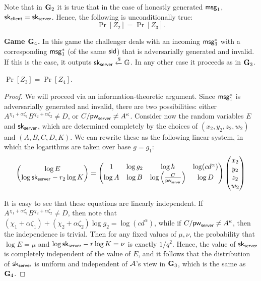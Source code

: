 Note that in $\mathbf{G}_2$ it is true that in the case of honestly generated $\mathsf{msg}_{1}$, $\mathsf{sk}_{\mathsf{client}} = \mathsf{sk}_{\mathsf{server}}$. Hence, the following is unconditionally true: $$\Pr[Z_2]=\Pr[Z_3].$$

\textbf{Game $\mathbf{G}_4$.} In this game the challenger deals with an incoming $\mathsf{msg}_{3}^{*}$ with a corresponding $\mathsf{msg}_{1}^{*}$ (of the same $\mathsf{sid}$) that is adversarially generated and invalid. If this is the case, it outputs $\mathsf{sk}_{\mathsf{server}}\xleftarrow{\$}\mathbb{G}$. In any other case it proceeds as in $\mathbf{G}_3$.

\begin{lemma}
\label{lem:invalid}
	$\Pr[Z_3]=\Pr[Z_4]$.
\end{lemma}
\begin{proof}
	We will proceed via an information-theoretic argument. Since $\mathsf{msg}_{1}^{*}$ is adversarially generated and invalid, there are two possibilities: either $A^{\chi_1+\alpha\zeta_1}B^{\chi_2+\alpha\zeta_2}\neq D$, or $C/\mathsf{pw}_{\mathsf{server}}\neq A^\kappa$. Consider now the random variables $E$ and $\mathsf{sk}_{\mathsf{server}}$, which are determined completely by the choices of $(x_2,y_2,z_2,w_2)$ and $(A,B,C,D,K)$. We can rewrite these as the following linear system, in which the logarithms are taken over base $g = g_1$:
	\begin{equation}
		\label{eq:linear}
		\begin{pmatrix}
			\log E\\
			\log\mathsf{sk}_{\mathsf{server}}-r_2\log K
		\end{pmatrix} =
		\begin{pmatrix}
			1 & \log g_2 & \log h & \log (cd^\alpha)\\
			\log A& \log B & \log \left(\frac{C}{\mathsf{pw}_{\mathsf{server}}}\right) & \log D
		\end{pmatrix}
		\begin{pmatrix}
			x_2\\
			y_2\\
			z_2\\
			w_2
		\end{pmatrix}
	\end{equation}

	It is easy to see that these equations are linearly independent.  If $A^{\chi_1+\alpha\zeta_1}B^{\chi_2+\alpha\zeta_2}\neq D$, then note that $(\chi_1+\alpha\zeta_1) + (\chi_2+\alpha\zeta_2)\log g_2 = \log (cd^\alpha)$, while if $C/\mathsf{pw}_{\mathsf{server}}\neq A^\kappa$, then the independence is trivial. Then for any fixed values of $\mu, \nu$, the probability that $\log E=\mu$ and $\log\mathsf{sk}_{\mathsf{server}}-r\log K=\nu$ is exactly $1/q^2$. Hence, the value of $\mathsf{sk}_{\mathsf{server}}$ is completely independent of the value of $E$, and it follows that the distribution of $\mathsf{sk}_{\mathsf{server}}$ is uniform and independent of $\mathcal{A}$'s view in $\mathbf{G}_3$, which is the same as $\mathbf{G}_4$.
\end{proof}

